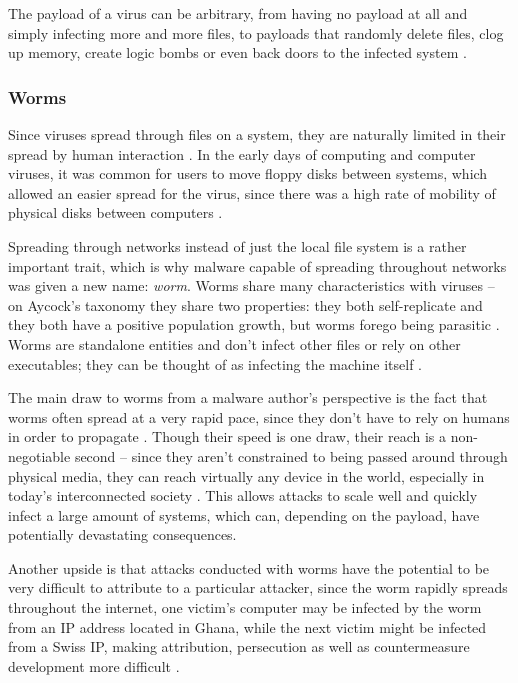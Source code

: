 The payload of a virus can be arbitrary, from having no payload at all and simply infecting more and more files, to
payloads that randomly delete files, clog up memory, create logic bombs or even back doors to the infected system 
\cite{viruses-revealed-book, skoudis-book, cohen-virus-course}. 

\subsubsection{Worms} \label{subsec:worms}
Since viruses spread through files on a system, they are naturally limited in their spread by human interaction
\cite{aycock-book}. In the early days of computing and computer viruses, it was common for users to move floppy
disks between systems, which allowed an easier spread for the virus, since there was a high rate of mobility of physical
disks between computers \cite{cohen-virus-course}. 

Spreading through networks instead of just the local file system is a rather important trait, which is why malware capable of
spreading throughout networks was given a new name: \emph{worm}. Worms share many characteristics with viruses -- on
Aycock's taxonomy they share two properties: they both self-replicate and they both have a positive population growth,
but worms forego being parasitic \cite[p.~15]{aycock-book}. Worms are standalone entities and
don't infect other files or rely on other executables; they can be thought of as infecting the machine itself \cite{
aycock-book, viruses-revealed-book}.

The main draw to worms from a malware author's perspective is the fact that worms often spread at a very rapid pace,
since they don't have to rely on humans in order to propagate \cite{aycock-book, skoudis-book, viruses-revealed-book}.
Though their speed is one draw, their reach is a non-negotiable second -- since they aren't constrained to being passed
around through physical media, they can reach virtually any device in the world, especially in today's interconnected
society \cite{skoudis-book, aycock-book}. This allows attacks to scale well and quickly infect a large amount of systems,
which can, depending on the payload, have potentially devastating consequences.

Another upside is that attacks conducted with worms have the potential to be very difficult to attribute to a particular
attacker, since the worm rapidly spreads throughout the internet, one victim's computer may be infected by the worm from
an IP address located in Ghana, while the next victim might be infected from a Swiss IP, making attribution, persecution
as well as countermeasure development more difficult \cite{skoudis-book}.

